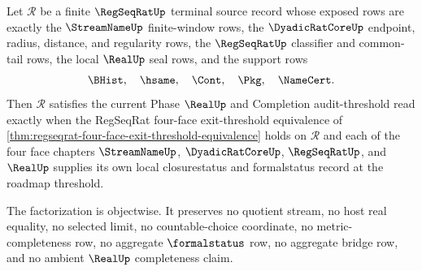 \begin{theorem}
\label{thm:regseqrat-four-face-audit-threshold-factorization}
Let $\mathcal R$ be a finite $\RegSeqRatUp$ terminal source record whose exposed rows are exactly the $\StreamNameUp$ finite-window rows, the $\DyadicRatCoreUp$ endpoint, radius, distance, and regularity rows, the $\RegSeqRatUp$ classifier and common-tail rows, the local $\RealUp$ seal rows, and the support rows
$$
\BHist,\quad \hsame,\quad \Cont,\quad \Pkg,\quad \NameCert.
$$
Then $\mathcal R$ satisfies the current Phase $\RealUp$ and Completion audit-threshold read exactly when the RegSeqRat four-face exit-threshold equivalence of \autoref{thm:regseqrat-four-face-exit-threshold-equivalence} holds on $\mathcal R$ and each of the four face chapters $\StreamNameUp$, $\DyadicRatCoreUp$, $\RegSeqRatUp$, and $\RealUp$ supplies its own local closurestatus and formalstatus record at the roadmap threshold.

The factorization is objectwise. It preserves no quotient stream, no host real equality, no selected limit, no countable-choice coordinate, no metric-completeness row, no aggregate $\formalstatus$ row, no aggregate bridge row, and no ambient $\RealUp$ completeness claim.
\end{theorem}
